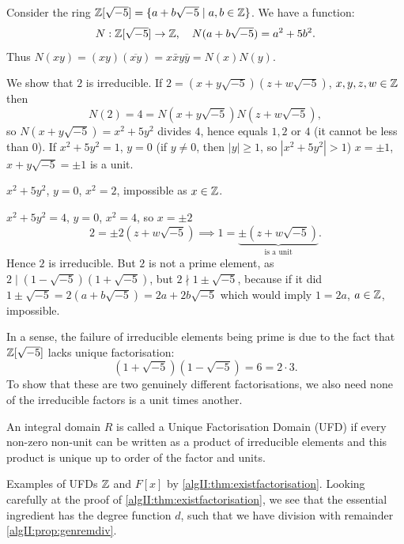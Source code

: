 \documentclass[10pt, a4paper]{article}
\begin{document}
\begin{example}\label{algII:examp:irrednotprime}
    Consider the ring $\mathbb{Z}[\sqrt{-5}] = \{a + b\sqrt{-5} \mid a, b \in \mathbb{Z}\}$.
    We have a function:
    \[
    N : \mathbb{Z}[\sqrt{-5}] \to \mathbb{Z},\quad N(a + b\sqrt{-5}) = a ^ 2 + 5b ^ 2.
    \]
    Thus $N(xy) = (xy)(\overline{xy}) = x\bar{x}y\bar{y} = N(x)N(y)$.

    We show that $2$ is irreducible.
    If $2 = (x + y\sqrt{-5})(z + w\sqrt{-5})$,
    $x, y, z, w \in \mathbb{Z}$ then
    \[
    N(2) = 4 = N(x + y\sqrt{-5})N(z + w\sqrt{-5}),
    \]
    so $N(x + y\sqrt{-5}) = x ^ 2 + 5y ^ 2$ divides $4$,
    hence equals $1, 2$ or $4$
    (it cannot be less than $0$).
    If $x ^ 2 + 5y ^ 2 = 1$,
    $y = 0$
    (if $y \neq 0$,
    then $|y| \geq 1$,
    so $|x ^ 2 + 5y ^ 2| > 1$)
    $x = \pm 1$,
    $x + y\sqrt{-5} = \pm 1$ is a unit.

    $x ^ 2 + 5y ^ 2$,
    $y = 0$,
    $x ^ 2 = 2$,
    impossible as $x \in \mathbb{Z}$.

    $x ^ 2 + 5y ^ 2 = 4$,
    $y = 0$,
    $x ^ 2 = 4$,
    so $x = \pm 2$
    \[
    2 = \pm 2(z + w\sqrt{-5}) \implies 1 = \underbrace{\pm(z + w\sqrt{-5})}_{\text{is a unit}}.
    \]
    Hence $2$ is irreducible.
    But $2$ is not a prime element,
    as $2 \mid (1 - \sqrt{-5})(1 + \sqrt{-5})$,
    but $2 \nmid 1 \pm \sqrt{-5}$,
    because if it did $1 \pm \sqrt{-5} = 2(a + b\sqrt{-5}) = 2a + 2b\sqrt{-5}$ which would imply $1 = 2a$,
    $a \in \mathbb{Z}$,
    impossible.
    
    In a sense,
    the failure of irreducible elements being prime is due to the fact that $\mathbb{Z}[\sqrt{-5}]$ lacks unique factorisation:
    \[
    (1 + \sqrt{-5})(1 - \sqrt{-5}) = 6 = 2 \cdot 3.
    \]
    To show that these are two genuinely different factorisations,
    we also need none of the irreducible factors is a unit times another.
\end{example}

\begin{definition}
    An integral domain $R$ is called a Unique Factorisation Domain
    (UFD)
    if every non-zero non-unit can be written as a product of irreducible elements and this product is unique up to order of the factor and units.
\end{definition}

Examples of UFDs $\mathbb{Z}$ and $F[x]$ by \autoref{algII:thm:existfactorisation}.
Looking carefully at the proof of \autoref{algII:thm:existfactorisation},
we see that the essential ingredient has the degree function $d$,
such that we have division with remainder \autoref{algII:prop:genremdiv}.
\end{document}
